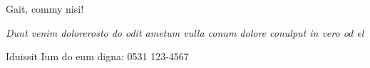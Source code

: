 \documentclass[a3paper,style=bulletin]{tubsposter}
\begin{document}
  \begin{tubsposter}
    \vspace*{100pt}
    {
      Gait, commy nisi!\par\vspace*{1.5ex}}

    {\itshape\huge\color{tuRed}
      Dunt venim dolorerosto do odit
      ametum vulla conum dolore
      co\-nulput in vero od el\par}

    \vfill

    {\Large
      Iduissit Ium do eum digna: 0531 123-4567}
  \end{tubsposter}
\end{document}
